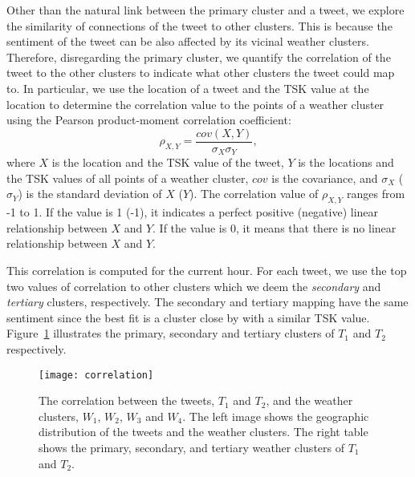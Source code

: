 Other than the natural link between the primary cluster and a tweet, we explore the similarity of connections of the tweet to other clusters. %
This is because the sentiment of the tweet can be also affected by its vicinal weather clusters. Therefore, disregarding the primary cluster, we quantify the correlation of the tweet to the other clusters to indicate what other clusters the tweet could map to. In particular, we use the location of a tweet and the TSK value at the location to determine the correlation value to the points of a weather cluster using the Pearson product-moment correlation coefficient:
\begin{equation}
\label{eq:pearson}
\rho_{X,Y}=\frac{cov(X,Y)}{\sigma_{X}\sigma_{Y}},
\end{equation}
where $X$ is the location and the TSK value of the tweet, $Y$ is the locations and the TSK values of all points of a weather cluster, $cov$ is the covariance, and $\sigma_{X}$ ($\sigma_{Y}$) is the standard deviation of $X$ ($Y$). The correlation value of $\rho_{X,Y}$ ranges from -1 to 1. If the value is 1 (-1), it indicates a perfect positive (negative) linear relationship between $X$ and $Y$. If the value is 0, it means that there is no linear relationship between $X$ and $Y$.

This correlation is computed for the current hour. For each tweet, we use the top two values of correlation to other clusters which we deem the \emph{secondary} and \emph{tertiary} clusters, respectively. The secondary and tertiary mapping have the same sentiment since the best fit is a cluster close by with a similar TSK value. Figure~\ref{fig:correlation} illustrates the primary, secondary and tertiary clusters of $T_1$ and $T_2$ respectively.



\begin{figure}[t]
\begin{center}
\texttt{[image: correlation]}
\end{center}
\vspace{-.1in}
\caption{The correlation between the tweets, $T_1$ and $T_2$, and the weather clusters, $W_1$, $W_2$, $W_3$ and $W_4$. The left image shows the geographic distribution of the tweets and the weather clusters. The right table shows the primary, secondary, and tertiary weather clusters of $T_1$ and $T_2$.}
\label{fig:correlation}
\end{figure}

